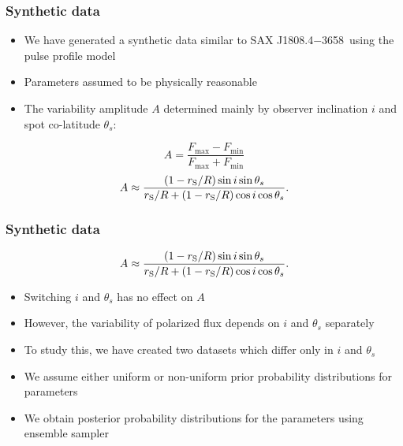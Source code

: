 \documentclass{beamer}
\def\rg{r_{\rm S}} %
\def\be{\begin{equation}}
\def\ee{\end{equation}}
\def\rg{r_{\rm S}} %
\def\source{SAX J1808.4$-$3658}
\def\thetas{\theta_{s}}
\begin{document}
\begin{frame}
\frametitle{Synthetic data}

\begin{itemize}
\item We have generated a synthetic data similar to \source \ using the pulse profile model
\item Parameters assumed to be physically reasonable
\item The variability amplitude $A$ determined mainly by observer inclination $i$ and spot co-latitude $\thetas$:
\end{itemize}
\be \label{eq:amplitude}
A = \frac{F_{\mathrm{max}} - F_{\mathrm{min}}} {F_{\mathrm{max}} + F_{\mathrm{min}}}
\ee %
\be \label{eq:amplitude_incthet}
A \approx \frac{(1-\rg/R)\sin i \sin \thetas}{\rg/R+(1-\rg/R)\cos i \cos \thetas}.
\ee 



\end{frame}


\begin{frame}
\frametitle{Synthetic data}


\be \label{eq:amplitude_incthet}
A \approx \frac{(1-\rg/R)\sin i \sin \thetas}{\rg/R+(1-\rg/R)\cos i \cos \thetas}.
\ee 
\begin{itemize}
\item Switching $i$ and $\thetas$ has no effect on $A$
\item However, the variability of polarized flux depends on $i$ and $\thetas$ separately
\item To study this, we have created two datasets which differ only in $i$ and $\thetas$
\item We assume either uniform or non-uniform prior probability distributions for parameters
\item We obtain posterior probability distributions for the parameters using ensemble sampler


\end{itemize}


\end{frame}
\end{document}
